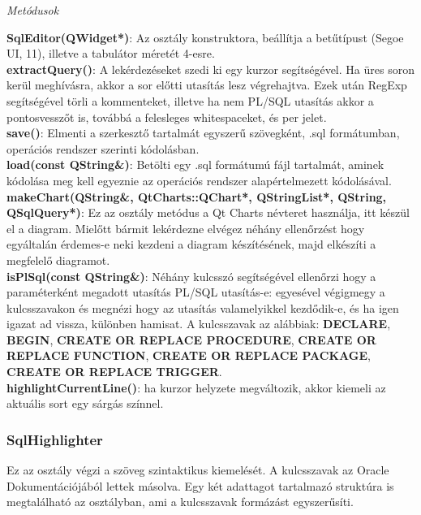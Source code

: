 \begin{flushleft}
\textit{Metódusok}
\end{flushleft}
\textbf{SqlEditor(QWidget*)}: Az osztály konstruktora, beállítja a betűtípust (Segoe UI, 11), illetve a
tabulátor méretét 4-esre. \\
\textbf{extractQuery()}: A lekérdezéseket szedi ki egy kurzor segítségével. Ha üres soron kerül meghívásra, akkor a sor előtti utasítás lesz végrehajtva. Ezek után RegExp segítségével
törli a kommenteket, illetve ha nem PL/SQL utasítás akkor a pontosvesszőt is, továbbá a felesleges whitespaceket, és per jelet. \\
\textbf{save()}: Elmenti a szerkesztő tartalmát egyszerű szövegként, .sql formátumban, operációs rendszer szerinti kódolásban. \\
\textbf{load(const QString\&)}: Betölti egy .sql formátumú fájl tartalmát, aminek kódolása
meg kell egyeznie az operációs rendszer alapértelmezett kódolásával. \\
\textbf{makeChart(QString\&, QtCharts::QChart*, QStringList*, QString, QSqlQuery*)}: Ez az osztály metódus a Qt Charts névteret használja, itt készül el a diagram. Mielőtt bármit lekérdezne elvégez néhány ellenőrzést hogy egyáltalán érdemes-e neki kezdeni a diagram készítésének, majd elkészíti a megfelelő diagramot. \\
\textbf{isPlSql(const QString\&)}: Néhány kulcsszó segítségével ellenőrzi hogy a paraméterként megadott utasítás PL/SQL utasítás-e: egyesével végigmegy a kulcsszavakon és megnézi hogy az utasítás valamelyikkel kezdődik-e, és ha igen igazat ad vissza, különben hamisat. A kulcsszavak az alábbiak: \textbf{DECLARE}, \textbf{BEGIN}, \textbf{CREATE OR REPLACE PROCEDURE}, \textbf{CREATE OR REPLACE FUNCTION}, \textbf{CREATE OR REPLACE PACKAGE}, \textbf{CREATE OR REPLACE TRIGGER}. \\
\textbf{highlightCurrentLine()}: ha kurzor helyzete megváltozik, akkor kiemeli az aktuális sort egy sárgás színnel.

\subsubsection{SqlHighlighter}

Ez az osztály végzi a szöveg szintaktikus kiemelését. A kulcsszavak az Oracle Dokumentációjából\cite{oracledocsref} lettek másolva. Egy két adattagot tartalmazó struktúra is megtalálható az osztályban, ami a kulcsszavak formázást egyszerűsíti.

